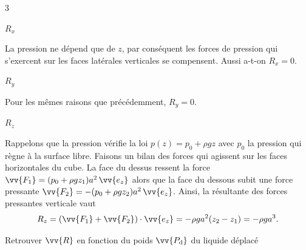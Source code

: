 \begin{multicols}{3}

\begin{enonce}
$R_x$
\end{enonce}


\begin{corrige}
La pression ne dépend que de $z$, par conséquent les forces de pression qui s'exercent sur les faces latérales verticales se compensent. Aussi a-t-on $R_x=0$.
\end{corrige}

\begin{enonce}
$R_y$
\end{enonce}


\begin{corrige}
Pour les mêmes raisons que précédemment, $R_y=0$.
\end{corrige}

\begin{enonce}
$R_z$
\end{enonce}


\begin{corrige}
Rappelons que la pression vérifie la loi $p(z)=p_0+\rho g z$ avec $p_0$ la pression qui règne à la surface libre. 
Faisons un bilan des forces qui agissent sur les faces horizontales du cube. La face du dessus ressent la force $\vv{F_1}=(p_0+\rho g z_1)a^2\, \vv{e_z}$ alors que la face du dessous subit une force pressante $\vv{F_2}=-(p_0+\rho g z_2)a^2\, \vv{e_z}$. Ainsi, la résultante des forces pressantes verticale vaut 
\[
R_z=(\vv{F_1}+\vv{F_2})\cdot \vv{e_z}=-\rho g a^2(z_2-z_1)=-\rho g a^3.
\]
\end{corrige}
\end{multicols}

\begin{enonce}
Retrouver $\vv{R}$ en fonction du poids $\vv{P_\text{d}}$ du liquide déplacé
\end{enonce}


